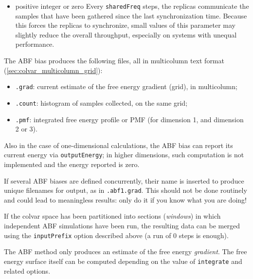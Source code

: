 {\begin{itemize}
\item
  {positive integer or zero}
  {}
  {
    Every \texttt{sharedFreq} steps, the replicas communicate the samples that have been gathered since the last synchronization time.
    Because this forces the replicas to synchronize, small values of this parameter may slightly reduce the overall throughput, especially on systems with unequal performance.
  }
\end{itemize}
}


The ABF bias produces the following files, all in multicolumn text format (\ref{sec:colvar_multicolumn_grid}):
\begin{itemize}
\item \outputName\texttt{.grad}: current estimate of the free energy gradient (grid),
  in multicolumn;
\item \outputName\texttt{.count}: histogram of samples collected, on the same grid;
\item \outputName\texttt{.pmf}: integrated free energy profile or PMF (for dimension 1, and dimension 2 or 3).
\end{itemize}

Also in the case of one-dimensional calculations, the ABF bias can report its current energy via \texttt{outputEnergy}; in higher dimensions, such computation is not implemented and the energy reported is zero.

If several ABF biases are defined concurrently, their name is inserted to produce
unique filenames for output, as in \outputName\texttt{.abf1.grad}.
This should not be done routinely and could lead to meaningless results:
only do it if you know what you are doing!

If the colvar space has been partitioned into sections (\emph{windows}) in which independent
ABF simulations have been run, the resulting data can be merged using the
\texttt{inputPrefix} option described above (a run of 0 steps is enough).




The ABF method only produces an estimate of the free energy \emph{gradient}.
The free energy surface itself can be computed depending on the value of \texttt{integrate} and related options.

